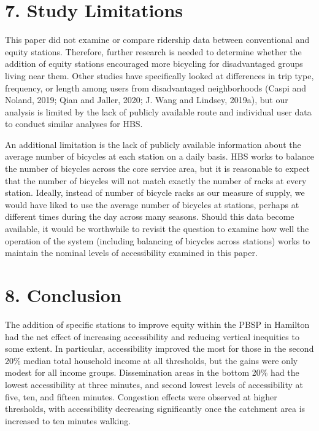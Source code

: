 \documentclass[]{elsarticle} %
\begin{document}
\hypertarget{study-limitations}{%
\section{7. Study Limitations}\label{study-limitations}}

This paper did not examine or compare ridership data between
conventional and equity stations. Therefore, further research is needed
to determine whether the addition of equity stations encouraged more
bicycling for disadvantaged groups living near them. Other studies have
specifically looked at differences in trip type, frequency, or length
among users from disadvantaged neighborhoods (Caspi and Noland, 2019;
Qian and Jaller, 2020; J. Wang and Lindsey, 2019a), but our analysis is
limited by the lack of publicly available route and individual user data
to conduct similar analyses for HBS.

An additional limitation is the lack of publicly available information
about the average number of bicycles at each station on a daily basis.
HBS works to balance the number of bicycles across the core service
area, but it is reasonable to expect that the number of bicycles will
not match exactly the number of racks at every station. Ideally, instead
of number of bicycle racks as our measure of supply, we would have liked
to use the average number of bicycles at stations, perhaps at different
times during the day across many seasons. Should this data become
available, it would be worthwhile to revisit the question to examine how
well the operation of the system (including balancing of bicycles across
stations) works to maintain the nominal levels of accessibility examined
in this paper.

\hypertarget{conclusion}{%
\section{8. Conclusion}\label{conclusion}}

The addition of specific stations to improve equity within the PBSP in
Hamilton had the net effect of increasing accessibility and reducing
vertical inequities to some extent. In particular, accessibility
improved the most for those in the second 20\% median total household
income at all thresholds, but the gains were only modest for all income
groups. Dissemination areas in the bottom 20\% had the lowest
accessibility at three minutes, and second lowest levels of
accessibility at five, ten, and fifteen minutes. Congestion effects were
observed at higher thresholds, with accessibility decreasing
significantly once the catchment area is increased to ten minutes
walking.
\end{document}
